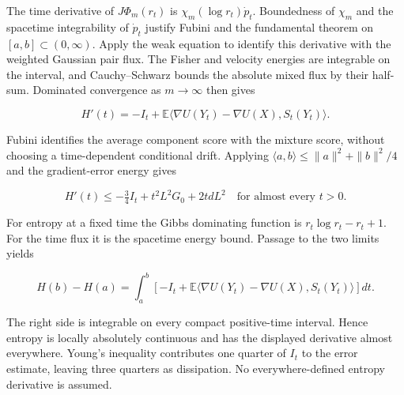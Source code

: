 \documentclass[11pt,a4paper]{article}
\begin{document}
The time derivative of \(J\Phi_m(r_t)\) is \(\chi_m(\log r_t)\dot p_t\). Boundedness of \(\chi_m\) and the spacetime integrability of \(\dot p_t\) justify Fubini and the fundamental theorem on \([a,b]\subset(0,\infty)\). Apply the weak equation to identify this derivative with the weighted Gaussian pair flux. The Fisher and velocity energies are integrable on the interval, and Cauchy–Schwarz bounds the absolute mixed flux by their half-sum. Dominated convergence as \(m\to\infty\) then gives

\[H'(t)=-I_t+\mathbb E\langle\nabla U(Y_t)-\nabla U(X),S_t(Y_t)\rangle.\]

Fubini identifies the average component score with the mixture score, without choosing a time-dependent conditional drift. Applying \(\langle a,b\rangle\le\|a\|^2+\|b\|^2/4\) and the gradient-error energy gives

\[\boxed{H'(t)\le-\tfrac34I_t+t^2L^2G_0+2tdL^2}\quad\text{for almost every }t>0.\]

For entropy at a fixed time the Gibbs dominating function is \(r_t\log r_t-r_t+1\). For the time flux it is the spacetime energy bound. Passage to the two limits yields

\[H(b)-H(a)=\int_a^b\left[-I_t+
\mathbb E\langle\nabla U(Y_t)-\nabla U(X),S_t(Y_t)\rangle\right]dt.\]

The right side is integrable on every compact positive-time interval. Hence entropy is locally absolutely continuous and has the displayed derivative almost everywhere. Young’s inequality contributes one quarter of \(I_t\) to the error estimate, leaving three quarters as dissipation. No everywhere-defined entropy derivative is assumed.
\end{document}
